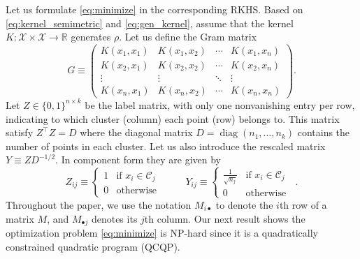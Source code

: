 \documentclass[aps,preprint,nofootinbib,floatfix]{revtex4-1}
\DeclareMathOperator{\diag}{diag}
\newcommand\kk{K}
\newcommand\C{{\mathcal{C}}}
\newcommand\Zt{Y}
\begin{document}
Let us formulate \eqref{eq:minimize} in the corresponding
RKHS. Based on \eqref{eq:kernel_semimetric} and \eqref{eq:gen_kernel}, 
assume that the kernel $\kk: \mathcal{X} \times \mathcal{X} \to \mathbb{R}$ 
generates $\rho$.  Let us define  the Gram matrix
\begin{equation}
\label{eq:kernel_matrix}
G \equiv \begin{pmatrix}
\kk(x_1,x_1) & \kk(x_1,x_2) & \dotsm & \kk(x_1,x_n) \\
\kk(x_2,x_1) & \kk(x_2,x_2) & \dotsm & \kk(x_2,x_n) \\
\vdots & \vdots & \ddots  & \vdots \\
\kk(x_n,x_1) & \kk(x_n,x_2) & \dotsm & \kk(x_n,x_n) 
\end{pmatrix} .
\end{equation}
Let $Z \in \{ 0,1 \}^{n\times k}$ be the label matrix, 
with only one nonvanishing entry per row, 
indicating to which cluster (column)
each point (row) belongs to. This matrix satisfy
$Z^\top Z = D$ where the diagonal matrix 
$D = \diag( n_1,\dotsc, n_k )$  contains
the number of points in each cluster. Let us also introduce the rescaled
matrix  $Y \equiv Z D^{-1/2}$. In component form they are given by
\begin{equation}
\label{eq:label_matrix}
Z_{ij} \equiv \begin{cases}
1 & \mbox{if $x_i \in \C_j$ } \\
0 & \mbox{otherwise}
\end{cases} \qquad
\Zt_{ij} \equiv \begin{cases}
\tfrac{1}{\sqrt{n_j}} & \mbox{if $x_i \in \C_j$ } \\
0 & \mbox{otherwise}
\end{cases} .
\end{equation}
Throughout the paper, we use the notation $M_{i\bullet}$ to denote
the $i$th row of a matrix $M$, and $M_{\bullet j}$ denotes its $j$th column.
Our next result shows the optimization problem \eqref{eq:minimize}
is NP-hard since
it is a quadratically constrained quadratic program (QCQP).
\end{document}
